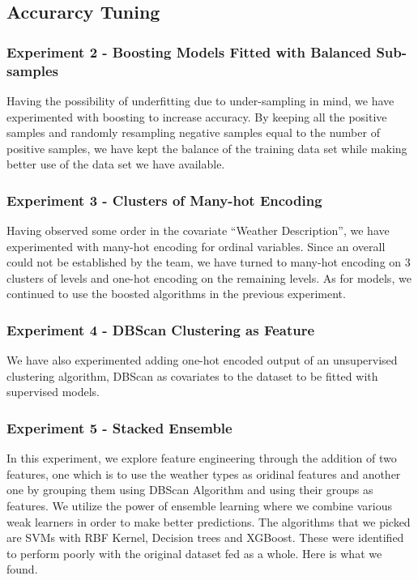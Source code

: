 \documentclass[10pt]{article}
\begin{document}
\subsection{Accurarcy Tuning}
\subsubsection{Experiment 2 - Boosting Models Fitted with Balanced
               Sub-samples}
Having the possibility of underfitting due to under-sampling in mind, we
have experimented with boosting to increase accuracy. By keeping all the
positive samples and randomly resampling negative samples equal to the
number of positive samples, we have kept the balance of the training data
set while making better use of the data set we have available.\par
\subsubsection{Experiment 3 - Clusters of Many-hot Encoding}
Having observed some order in the covariate ``Weather Description'', we
have experimented with many-hot encoding for ordinal variables. Since an
overall could not be established by the team, we have turned to many-hot
encoding on 3 clusters of levels and one-hot encoding on the remaining
levels. As for models, we continued to use the boosted algorithms in the
previous experiment.\par
\subsubsection{Experiment 4 - DBScan Clustering as Feature}
We have also experimented adding one-hot encoded output of an unsupervised
clustering algorithm, DBScan as covariates to the dataset to be fitted with
supervised models.\par
\subsubsection{Experiment 5 - Stacked Ensemble}
In this experiment, we explore feature engineering through the addition of
two features, one which is to use the weather types as oridinal features
and another one by grouping them using DBScan Algorithm and using their
groups as features. We utilize the power of ensemble learning where we
combine various weak learners in order to make better predictions. The
algorithms that we picked are SVMs with RBF Kernel, Decision trees and
XGBoost.
These were identified to perform poorly with the original dataset fed as a
whole. Here is what we found.
\par
\end{document}
